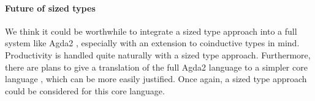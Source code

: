 \paragraph*{Future of sized types}
We think it could be worthwhile to integrate a sized type approach into a full system like Agda2 \cite{norell:thesis}, especially with an extension to coinductive types in mind. Productivity is handled quite naturally with a sized type approach. 
Furthermore, there are plans to give a translation of the full Agda2 language to a simpler core language \cite{mini-tt}, which can be more easily justified. Once again, a sized type approach could be considered for this core language.

